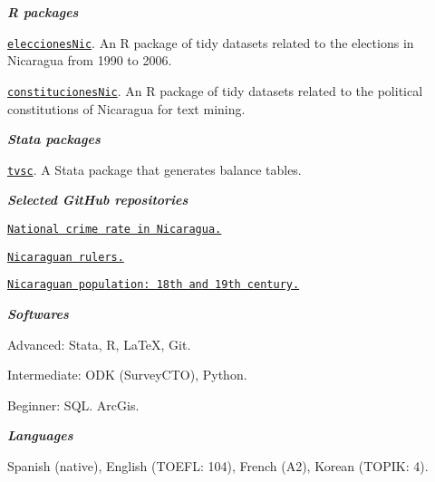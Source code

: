 \documentclass[11pt,article,oneside, a4paper]{memoir}
\begin{document}
\medskip
\noindent\emph{\textbf{R packages} \vspace{0.05in}}

\ind \texttt{\href{https://github.com/RRMaximiliano/eleccionesNic}{eleccionesNic}}. An R package of tidy datasets related to the elections in Nicaragua from 1990 to 2006.

\ind \texttt{\href{https://github.com/RRMaximiliano/constitucionesNic}{constitucionesNic}}. An R package of tidy datasets related to the political constitutions of Nicaragua for text mining.

\medskip
\noindent\emph{\textbf{Stata packages} \vspace{0.05in}}

\ind \texttt{\href{https://github.com/RRMaximiliano/tvsc}{tvsc}}. A Stata package that generates balance tables.

\medskip
\noindent\emph{\textbf{Selected GitHub repositories} \vspace{0.05in}}

\ind \texttt{\href{https://github.com/RRMaximiliano/policia-nacional-nic-stats}{National crime rate in Nicaragua.}}

\ind \texttt{\href{https://github.com/RRMaximiliano/nicaraguan-rulers}{Nicaraguan rulers.}}

\ind \texttt{\href{https://github.com/RRMaximiliano/poblacion-nicaragua-siglo-18-19}{Nicaraguan population: 18th and 19th century.}} 

\bigskip
\medskip

\noindent\emph{\textbf{Softwares} \vspace{0.05in}}

\ind Advanced: Stata, R, \LaTeX, Git.

\ind Intermediate: ODK (SurveyCTO), Python.

\ind Beginner: SQL. ArcGis.

\medskip
\noindent\emph{\textbf{Languages} \vspace{0.05in}}

\ind Spanish (native), English (TOEFL: 104), French (A2), Korean (TOPIK: 4).

\bigskip
\medskip
\end{document}
